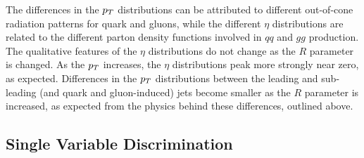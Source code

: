 The differences in the $p_T$ distributions can be attributed to different out-of-cone radiation
patterns for quark and gluons, while the different $\eta$ distributions are related to the different
parton density functions involved in $qq$ and $gg$ production. The qualitative features of the 
$\eta$ distributions do not change as the $R$ parameter is changed. As the $p_T$ increases, 
the $\eta$ distributions peak more strongly near zero, as expected. Differences in the $p_T$ distributions 
between the leading and sub-leading (and quark and gluon-induced) jets become smaller as the 
$R$ parameter is increased, as expected from the physics behind these differences, outlined above. 

\subsection{Single Variable Discrimination}

